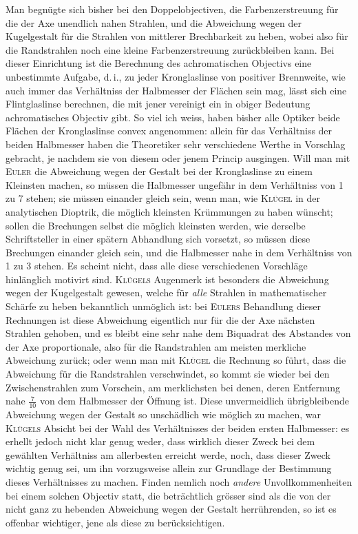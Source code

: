 Man begnügte sich bisher bei den Doppelobjectiven, die Farbenzerstreuung für die der Axe unendlich nahen Strahlen, und die Abweichung wegen der Kugelgestalt für die Strahlen von mittlerer Brechbarkeit zu heben, wobei also für die Randstrahlen noch eine kleine Farbenzerstreuung zurückbleiben kann. Bei dieser Einrichtung ist die Berechnung des achromatischen Objectivs eine unbestimmte Aufgabe, d.\,i., zu jeder Kronglaslinse von positiver Brennweite, wie auch immer das Verhältniss der Halbmesser der Flächen sein mag, lässt sich eine Flintglaslinse berechnen, die mit jener vereinigt ein in obiger Bedeutung achromatisches Objectiv gibt. So viel ich weiss, haben bisher alle Optiker beide Flächen der Kronglaslinse convex angenommen: allein für das Verhältniss der beiden Halbmesser haben die Theoretiker sehr verschiedene Werthe in Vorschlag gebracht, je nachdem sie von diesem oder jenem Princip ausgingen. Will man mit \textsc{Euler} die Abweichung wegen der Gestalt bei der Kronglaslinse zu einem Kleinsten machen, so müssen die Halbmesser ungefähr in dem Verhältniss von
1 zu 7 stehen; sie müssen einander gleich sein, wenn man, wie \textsc{Klügel} in der analytischen Dioptrik, die möglich kleinsten Krümmungen zu haben wünscht; sollen die Brechungen selbst die möglich kleinsten werden, wie derselbe Schriftsteller in einer spätern Abhandlung sich vorsetzt, so müssen diese Brechungen einander gleich sein, und die Halbmesser nahe in dem Verhältniss von 1 zu 3 stehen. Es scheint nicht, dass alle diese verschiedenen Vorschläge hinlänglich motivirt sind. \textsc{Klügels} Augenmerk ist besonders die Abweichung wegen der Kugelgestalt gewesen, welche für \textit{alle} Strahlen in mathematischer Schärfe zu heben bekanntlich unmöglich ist: bei \textsc{Eulers} Behandlung dieser Rechnungen ist diese Abweichung eigentlich nur für die der Axe nächsten Strahlen gehoben, und es bleibt eine sehr nahe dem Biquadrat des Abstandes von der Axe proportionale, also für die Randstrahlen am meisten merkliche Abweichung zurück; oder wenn man mit \textsc{Klügel} die Rechnung so führt, dass die Abweichung für die Randstrahlen verschwindet, so kommt sie wieder bei den Zwischenstrahlen zum Vorschein, am merklichsten bei denen, deren Entfernung nahe $\tfrac{7}{10}$ von dem Halbmesser der Öffnung ist. Diese unvermeidlich übrigbleibende Abweichung wegen der Gestalt so unschädlich wie möglich zu machen, war \textsc{Klügels} Absicht bei der Wahl des Verhältnisses der beiden ersten Halbmesser: es erhellt jedoch nicht klar genug weder, dass wirklich dieser Zweck bei dem gewählten Verhältniss am allerbesten erreicht werde, noch, dass dieser Zweck wichtig genug sei, um ihn vorzugsweise allein zur Grundlage der Bestimmung dieses Verhältnisses zu machen. Finden nemlich noch \textit{andere} Unvollkommenheiten bei einem solchen Objectiv statt, die beträchtlich grösser sind als die von der nicht ganz zu hebenden Abweichung wegen der Gestalt herrührenden, so ist es offenbar wichtiger, jene als diese zu berücksichtigen.

